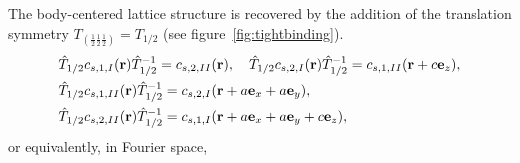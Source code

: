 The body-centered lattice structure is recovered by the addition of the translation symmetry $T_{(\frac{1}{2}\frac{1}{2}\frac{1}{2})}=T_{1/2}$ (see figure~\ref{fig:tightbinding}). 
\begin{align}
\begin{split}&\hat{T}_{1/2}c_{s,1,I}({\bf r})\hat{T}_{1/2}^{-1}=c_{s,2,II}({\bf r}),\quad\hat{T}_{1/2}c_{s,2,I}({\bf r})\hat{T}_{1/2}^{-1}=c_{s,1,II}({\bf r}+c{\bf e}_z),\\&\hat{T}_{1/2}c_{s,1,II}({\bf r})\hat{T}_{1/2}^{-1}=c_{s,2,I}({\bf r}+a{\bf e}_x+a{\bf e}_y),\\
&\hat{T}_{1/2}c_{s,2,II}({\bf r})\hat{T}_{1/2}^{-1}=c_{s,1,I}({\bf r}+a{\bf e}_x+a{\bf e}_y+c{\bf e}_z),
\end{split}
\label{thalf3d}
\end{align} 
or equivalently, in Fourier space, 
